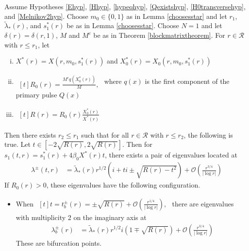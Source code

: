 \documentclass[thesis.tex]{subfiles}
\begin{document}
\begin{theorem}\label{theorem:kreinbubbles}
Assume Hypotheses \ref{Ehyp}, \ref{Hhyp}, \ref{hypeqhyp}, \ref{Qexistshyp}, \ref{H0transversehyp}, and \ref{Melnikov2hyp}. Choose $m_0 \in \{0, 1\}$ as in Lemma \ref{choosesstar} and let $r_1$, $\tilde{\lambda}_*(r)$, and $s_1^*(r)$ be as in Lemma \ref{choosesstar}. Choose $N = 1$ and let $\delta(r) = \delta(r,1)$, $M$ and $M^c$ be as in Theorem \ref{blockmatrixtheorem}. For $r \in \mathcal{R}$ with $r \leq r_1$, let
\begin{enumerate}[(i)]
\item $X^*(r) = X(r, m_0, s_1^*(r))$ and $X_0^*(r) = X_0(r, m_0, s_1^*(r))$
\item
$
\begin{aligned}[t]
R_0(r) = \frac{M^c q(X_0^*(r))}{M},
\end{aligned}
$
where $q(x)$ is the first component of the primary pulse $Q(x)$
\item
$
\begin{aligned}[t]
R(r) = R_0(r) \frac{X_0^*(r)}{X^*(r)}
\end{aligned}
$
\end{enumerate}

Then there exists $r_2 \leq r_1$ such that for all $r \in \mathcal{R}$ with $r \leq r_2$, the following is true. Let $t \in \left[-2\sqrt{R(r)}, 2\sqrt{R(r)}\right]$. Then for $s_1(t,r) = s_1^*(r) + 4 \beta_0 X^*(r) t$, there exists a pair of eigenvalues located at
\begin{align*}
\lambda^\pm(t, r) &= \tilde{\lambda}_*(r) r^{1/2} \left( i + t i \pm \sqrt{ R(r) - t^2 } \right) + \mathcal{O}\left(\frac{r^{3/4}}{|\log r|} \right)
\end{align*}
If $R_0(r) > 0$, these eigenvalues have the following configuration.
\begin{itemize}
\item When
$
\begin{aligned}[t]
t = t_b^\pm(r) = \pm \sqrt{R(r)} + \mathcal{O}\left( \frac{r^{1/4}}{|\log r|} \right),
\end{aligned}
$
there are eigenvalues with multiplicity 2 on the imaginary axis at 
\begin{align*}
\lambda_b^\pm(r) &= \tilde{\lambda}_*(r) r^{1/2} i \left( 1 \mp \sqrt{R(r)}\right) + \mathcal{O}\left( \frac{r^{3/4}}{|\log r|} \right) 
\end{align*}
These are bifurcation points.


\end{itemize}
\end{theorem}
\end{document}

